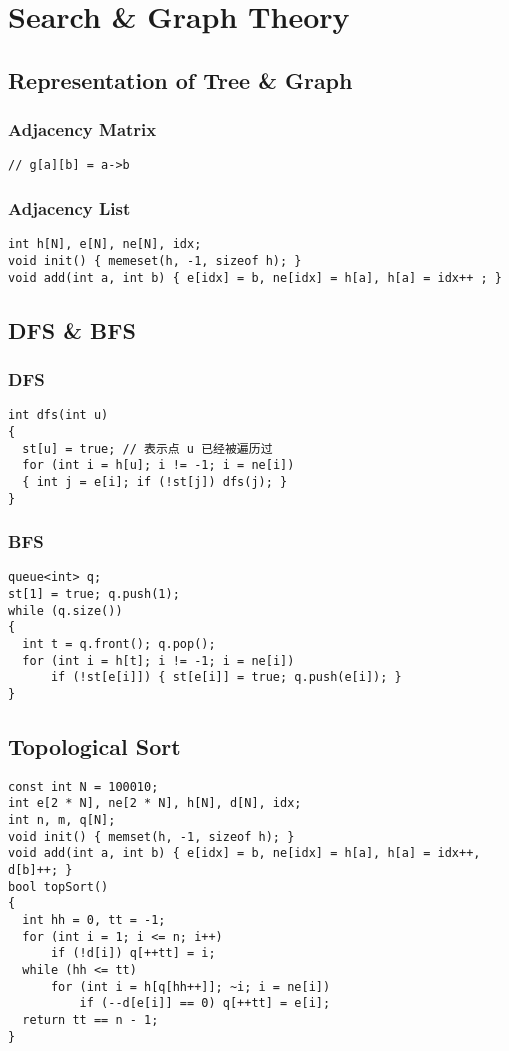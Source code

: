 \chapter{Search \& Graph Theory}\label{chap:Graph}
\section{Representation of Tree \& Graph}
\subsection{Adjacency Matrix}
\begin{lstlisting}
// g[a][b] = a->b
\end{lstlisting}
\subsection{Adjacency List}
\begin{lstlisting}
int h[N], e[N], ne[N], idx;
void init() { memeset(h, -1, sizeof h); }
void add(int a, int b) { e[idx] = b, ne[idx] = h[a], h[a] = idx++ ; }
\end{lstlisting}
\section{DFS \& BFS}
\subsection{DFS}
\begin{lstlisting}
int dfs(int u)
{
  st[u] = true; // 表示点 u 已经被遍历过
  for (int i = h[u]; i != -1; i = ne[i])
  { int j = e[i]; if (!st[j]) dfs(j); }
}
\end{lstlisting}
\subsection{BFS}
\begin{lstlisting}
queue<int> q;
st[1] = true; q.push(1);
while (q.size())
{
  int t = q.front(); q.pop();
  for (int i = h[t]; i != -1; i = ne[i])
      if (!st[e[i]]) { st[e[i]] = true; q.push(e[i]); }
}
\end{lstlisting}
\section{Topological Sort}
\begin{lstlisting}
const int N = 100010;
int e[2 * N], ne[2 * N], h[N], d[N], idx;
int n, m, q[N];
void init() { memset(h, -1, sizeof h); }
void add(int a, int b) { e[idx] = b, ne[idx] = h[a], h[a] = idx++, d[b]++; }
bool topSort()
{
  int hh = 0, tt = -1;
  for (int i = 1; i <= n; i++)
      if (!d[i]) q[++tt] = i;
  while (hh <= tt)
      for (int i = h[q[hh++]]; ~i; i = ne[i])
          if (--d[e[i]] == 0) q[++tt] = e[i];
  return tt == n - 1;
}
\end{lstlisting}
